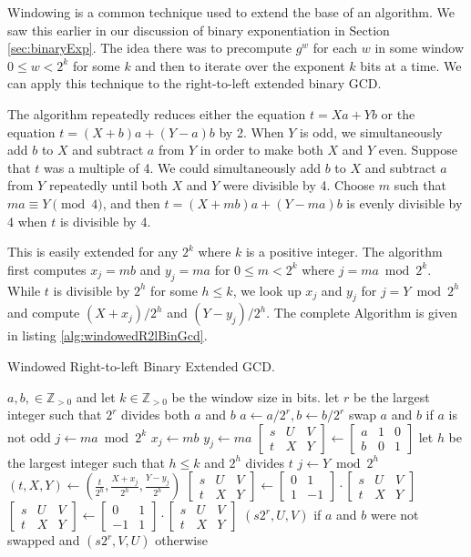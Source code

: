 \documentclass{ucalgthes1}
\theoremstyle{definition}
\newcommand{\ZZgtz}{\mathbb{Z}_{>0}}
\newcommand{\matrixtt}[4]{\left[ \begin{array}{rr} #1 & #2 \\ #3 & #4 \end{array} \right]}
\newcommand{\matrixThreeTwo}[6]{\left[ \begin{array}{rrr} #1 & #2 & #3 \\ #4 & #5 & #6 \end{array} \right]}
\begin{document}
Windowing is a common technique used to extend the base of an algorithm.  We saw this earlier in our discussion of binary exponentiation in Section \ref{sec:binaryExp}.  The idea there was to precompute $g^w$ for each $w$ in some window $0 \le w < 2^k$ for some $k$ and then to iterate over the exponent $k$ bits at a time.  We can apply this technique to the right-to-left extended binary GCD.

The algorithm repeatedly reduces either the equation $t=Xa+Yb$ or the equation $t=(X+b)a+(Y-a)b$ by 2. When $Y$ is odd, we simultaneously add $b$ to $X$ and subtract $a$ from $Y$ in order to make both $X$ and $Y$ even.  Suppose that $t$ was a multiple of 4.  We could simultaneously add $b$ to $X$ and subtract $a$ from $Y$ repeatedly until both $X$ and $Y$ were divisible by 4.  Choose $m$ such that $ma \equiv Y \pmod 4$, and then $t = (X+mb)a + (Y-ma)b$ is evenly divisible by 4 when $t$ is divisible by 4.

This is easily extended for any $2^k$ where $k$ is a positive integer.  The algorithm first computes $x_j = mb$ and $y_j = ma$ for $0 \le m < 2^k$ where $j = ma \bmod 2^k$.  While $t$ is divisible by $2^h$ for some $h \le k$, we look up $x_j$ and $y_j$ for $j = Y \bmod 2^h$ and compute $(X + x_j) / 2^h$ and $(Y - y_j) / 2^h$.  The complete Algorithm is given in listing \ref{alg:windowedR2lBinGcd}.

\begin{algorithm}[htb]
\caption{Windowed Right-to-left Binary Extended GCD.}
\label{alg:windowedR2lBinGcd}
\begin{algorithmic}[1]
\Require $a,b, \in \ZZgtz$ and let $k \in \ZZgtz$ be the window size in bits.
\State let $r$ be the largest integer such that $2^r$ divides both $a$ and $b$
\State $a \gets a / 2^r, b \gets b / 2^r$
\State swap $a$ and $b$ if $a$ is not odd
	\State $j \gets ma \bmod 2^k$
	\State $x_j \gets mb$
	\State $y_j \gets ma$
\EndFor
\State $\matrixThreeTwo{s}{U}{V}{t}{X}{Y} \gets \matrixThreeTwo{a}{1}{0}{b}{0}{1}$
		\State let $h$ be the largest integer such that $h \le k$ and $2^h$ divides $t$
		\State $j \gets Y \bmod 2^h$
		\State $(t, X, Y) \gets \left( \frac{t}{2^h}, \frac{X+x_j}{2^h}, \frac{Y-y_j}{2^h} \right)$  
	\EndWhile
		\State $\matrixThreeTwo{s}{U}{V}{t}{X}{Y} \gets \matrixtt{0}{1}{1}{-1} \cdot \matrixThreeTwo{s}{U}{V}{t}{X}{Y}$
	\Else
		\State $\matrixThreeTwo{s}{U}{V}{t}{X}{Y} \gets \matrixtt{0}{1}{-1}{1} \cdot \matrixThreeTwo{s}{U}{V}{t}{X}{Y}$
	\EndIf
\EndWhile
\State \Return $(s2^r, U, V)$ if $a$ and $b$ were not swapped and $(s2^r, V, U)$ otherwise
\end{algorithmic}
\end{algorithm}
\end{document}

